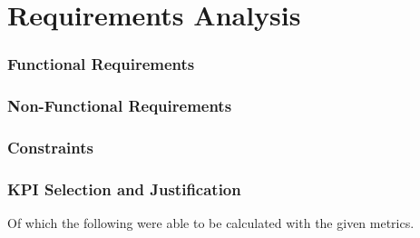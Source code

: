 \chapter{\textbf{Requirements Analysis}}\label{grundlagen}
\subsection{Functional Requirements} %
\subsection{Non-Functional Requirements} %
\subsection{Constraints} %
\subsection{KPI Selection and Justification}
 Of which the following were able to be calculated with the given metrics.
\\
